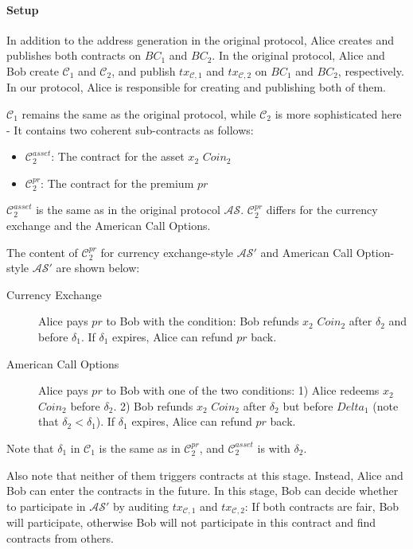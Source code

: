 \paragraph{\textbf{Setup}}
In addition to the address generation in the original protocol,
Alice creates and publishes both contracts on $BC_1$ and $BC_2$.
In the original protocol, Alice and Bob create $\mathcal{C}_1$ and $\mathcal{C}_2$, and publish $tx_{\mathcal{C}, 1}$ and $tx_{\mathcal{C}, 2}$ on $BC_1$ and $BC_2$, respectively.
In our protocol, Alice is responsible for creating and publishing both of them.

$\mathcal{C}_1$ remains the same as the original protocol, while $\mathcal{C}_2$ is more sophisticated here - It contains two coherent sub-contracts as follows:

\begin{itemize}
    \item $\mathcal{C}^{asset}_2$: The contract for the asset $x_2$ $Coin_2$
    \item $\mathcal{C}^{pr}_2$: The contract for the premium $pr$
\end{itemize}

$\mathcal{C}^{asset}_2$ is the same as in the original protocol $\mathcal{AS}$.
$\mathcal{C}^{pr}_2$ differs for the currency exchange and the American Call Options.

The content of $\mathcal{C}^{pr}_2$ for currency exchange-style $\mathcal{AS}'$ and American Call Option-style $\mathcal{AS}'$ are shown below:

\begin{description}
    \item[Currency Exchange] Alice pays $pr$ to Bob with the condition:
    Bob refunds $x_2$ $Coin_2$ after $\delta_2$ and before $\delta_1$.
    If $\delta_1$ expires, Alice can refund $pr$ back.
    \item[American Call Options] Alice pays $pr$ to Bob with one of the two conditions:
    1) Alice redeems $x_2$ $Coin_2$ before $\delta_2$.
    2) Bob refunds $x_2$ $Coin_2$ after $\delta_2$ but before $Delta_1$ (note that $\delta_2 < \delta_1$).
    If $\delta_1$ expires, Alice can refund $pr$ back.
\end{description}

Note that $\delta_1$ in $\mathcal{C}_1$ is the same as in $\mathcal{C}^{pr}_2$, and $\mathcal{C}^{asset}_2$ is with $\delta_2$.

Also note that neither of them triggers contracts at this stage.
Instead, Alice and Bob can enter the contracts in the future.
In this stage, Bob can decide whether to participate in $\mathcal{AS}'$ by auditing $tx_{\mathcal{C}, 1}$ and $tx_{\mathcal{C}, 2}$: If both contracts are fair, Bob will participate, otherwise Bob will not participate in this contract and find contracts from others.

